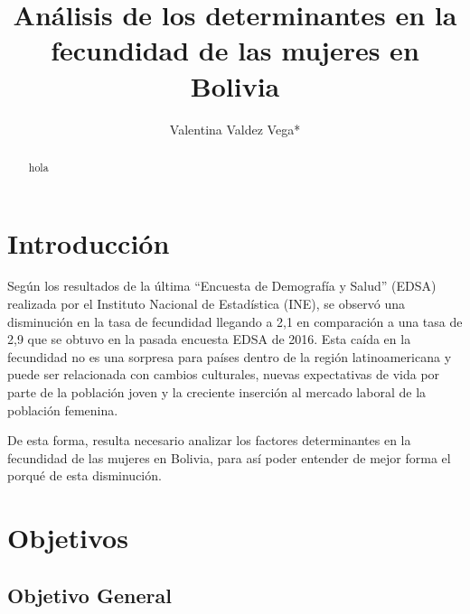 \documentclass[Royal,times,sageh]{sagej}
\begin{document}

\title{Análisis de los determinantes en la fecundidad de las mujeres en
Bolivia}


\author{Valentina Valdez Vega*}




\begin{abstract}
hola
\end{abstract}


\maketitle

\section{Introducción}\label{introducciuxf3n}

Según los resultados de la última ``Encuesta de Demografía y Salud''
(EDSA) realizada por el Instituto Nacional de Estadística (INE), se
observó una disminución en la tasa de fecundidad llegando a 2,1 en
comparación a una tasa de 2,9 que se obtuvo en la pasada encuesta EDSA
de 2016. Esta caída en la fecundidad no es una sorpresa para países
dentro de la región latinoamericana y puede ser relacionada con cambios
culturales, nuevas expectativas de vida por parte de la población joven
y la creciente inserción al mercado laboral de la población femenina.

De esta forma, resulta necesario analizar los factores determinantes en
la fecundidad de las mujeres en Bolivia, para así poder entender de
mejor forma el porqué de esta disminución.

\section{Objetivos}\label{objetivos}

\subsection{Objetivo General}\label{objetivo-general}
\end{document}
